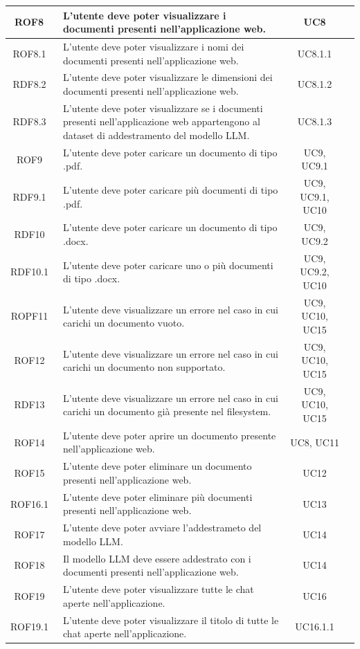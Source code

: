\documentclass[10pt, a4paper]{article}
\begin{document}
\begin{xltabular}{\textwidth}{|c|X|c|c}
\hline ROF8\ & L'utente deve poter visualizzare i documenti presenti nell'applicazione web. & UC8 \\
\hline ROF8.1\ & L'utente deve poter visualizzare i nomi dei documenti presenti nell'applicazione web. & UC8.1.1 \\
\hline RDF8.2\ & L'utente deve poter visualizzare le dimensioni dei documenti presenti nell'applicazione web. & UC8.1.2 \\
\hline RDF8.3\ & L'utente deve poter visualizzare se i documenti presenti nell'applicazione web appartengono al dataset di addestramento del modello LLM. & UC8.1.3 \\
\hline ROF9\ & L'utente deve poter caricare un documento di tipo .pdf. & UC9, UC9.1\\
\hline RDF9.1\ & L'utente deve poter caricare più documenti di tipo .pdf. & UC9, UC9.1, UC10 \\
\hline RDF10\ & L'utente deve poter caricare un documento di tipo .docx. & UC9, UC9.2 \\
\hline RDF10.1\ & L'utente deve poter caricare uno o più documenti di tipo .docx. & UC9, UC9.2, UC10 \\
\hline ROPF11\ & L'utente deve visualizzare un errore nel caso in cui carichi un documento vuoto. & UC9, UC10, UC15 \\
\hline ROF12\ & L'utente deve visualizzare un errore nel caso in cui carichi un documento non supportato. & UC9, UC10, UC15 \\
\hline RDF13\ & L'utente deve visualizzare un errore nel caso in cui carichi un documento già presente nel filesystem. & UC9, UC10, UC15 \\
\hline ROF14\ & L'utente deve poter aprire un documento presente nell'applicazione web. & UC8, UC11 \\
\hline ROF15\ & L'utente deve poter eliminare un documento presenti nell'applicazione web. & UC12\\
\hline ROF16.1\ & L'utente deve poter eliminare più documenti presenti nell'applicazione web. & UC13\\
\hline ROF17\ & L'utente deve poter avviare l'addestrameto del modello LLM. & UC14 \\
\hline ROF18\ & Il modello LLM deve essere addestrato con i documenti presenti nell'applicazione web. & UC14 \\
\hline ROF19\ & L'utente deve poter visualizzare tutte le chat aperte nell'applicazione. & UC16 \\
\hline ROF19.1\ & L'utente deve poter visualizzare il titolo di tutte le chat aperte nell'applicazione. & UC16.1.1 \\

\end{xltabular}
\end{document}
